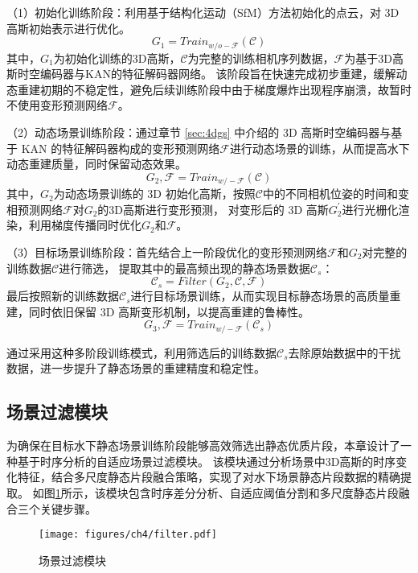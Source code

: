 （1）初始化训练阶段：利用基于结构化运动（SfM）方法\cite{sfm1}\cite{sfm2}初始化的点云，对 3D 高斯初始表示进行优化。
\begin{equation}
    G_1 = Train_{w/o-\mathcal{F} }(\mathcal{C})
\end{equation}
其中，$G_1$为初始化训练的3D高斯，$\mathcal{C}$为完整的训练相机序列数据，$\mathcal{F}$为基于3D高斯时空编码器与KAN的特征解码器网络。
该阶段旨在快速完成初步重建，缓解动态重建初期的不稳定性，避免后续训练阶段中由于梯度爆炸出现程序崩溃，故暂时不使用变形预测网络$\mathcal{F}$。

（2）动态场景训练阶段：通过章节 \ref{sec:4dgs} 中介绍的 3D 高斯时空编码器与基于 KAN 的特征解码器构成的变形预测网络$\mathcal{F}$进行动态场景的训练，从而提高水下动态重建质量，同时保留动态效果。
\begin{equation}
    G_2, \mathcal{F} = Train_{w/-\mathcal{F} }(\mathcal{C})
\end{equation}
其中，$G_2$为动态场景训练的 3D 初始化高斯，按照$\mathcal{C}$中的不同相机位姿的时间和变相预测网络$\mathcal{F}$对$G_2$的3D高斯进行变形预测，
对变形后的 3D 高斯$G_2^\prime$进行光栅化渲染，利用梯度传播同时优化$G_2$和$\mathcal{F}$。

（3）目标场景训练阶段：首先结合上一阶段优化的变形预测网络$\mathcal{F}$和$G_2$对完整的训练数据$\mathcal{C}$进行筛选，
提取其中的最高频出现的静态场景数据$\mathcal{C}_s$：
\begin{equation}
    \mathcal{C}_s = Filter(G_2, \mathcal{C}, \mathcal{F})
\end{equation}
最后按照新的训练数据$\mathcal{C}_s$进行目标场景训练，从而实现目标静态场景的高质量重建，同时依旧保留 3D 高斯变形机制，以提高重建的鲁棒性。
\begin{equation}
    G_3, \mathcal{F} = Train_{w/-\mathcal{F} }(\mathcal{C}_s)
\end{equation}

通过采用这种多阶段训练模式，利用筛选后的训练数据$\mathcal{C}_s$去除原始数据中的干扰数据，进一步提升了静态场景的重建精度和稳定性。

\subsection{场景过滤模块}
为确保在目标水下静态场景训练阶段能够高效筛选出静态优质片段，本章设计了一种基于时序分析的自适应场景过滤模块。
该模块通过分析场景中3D高斯的时序变化特征，结合多尺度静态片段融合策略，实现了对水下场景静态片段数据的精确提取。
如图\ref{img:filter}所示，该模块包含时序差分分析、自适应阈值分割和多尺度静态片段融合三个关键步骤。
\begin{figure}[htbp]
    \centering
    \texttt{[image: figures/ch4/filter.pdf]}
    \caption{场景过滤模块}
    \label{img:filter}
\end{figure}

